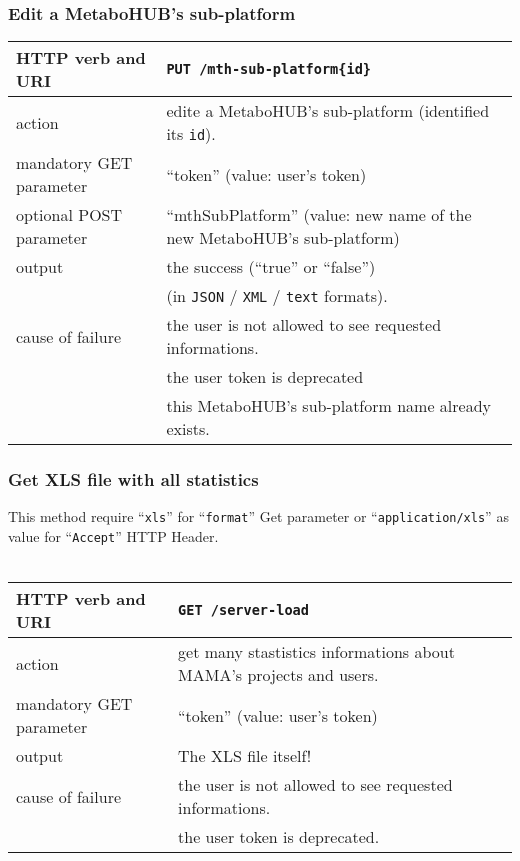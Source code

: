 \subsubsection{Edit a MetaboHUB's sub-platform}
\begin{tabular}{ | l | l | }
	\hline
	HTTP verb and URI & \texttt{PUT /mth-sub-platform\{id\}} \\
	\hline
	action & edite a MetaboHUB's sub-platform (identified \via its \texttt{id}). \\
	\hline
	mandatory GET parameter & ``token'' (value: user's token) \\
	\hline
	optional POST parameter & ``mthSubPlatform'' (value: new name of the new MetaboHUB's sub-platform) \\
	\hline
	output & the success (``true'' or ``false'')  \\
	\space & (in \texttt{JSON} / \texttt{XML} / \texttt{text} formats). \\
	\hline
	cause of failure & the user is not allowed to see requested informations. \\
	\space & the user token is deprecated \\
	\space & this MetaboHUB's sub-platform name already exists. \\
	\hline
\end{tabular}
\newline

\subsubsection{Get XLS file with all statistics}
\hspace*{\parindent}
This method require ``\texttt{xls}'' for ``\texttt{format}'' Get parameter or ``\texttt{application/xls}'' as value for ``\texttt{Accept}'' HTTP Header.
\\~\\
\begin{tabular}{ | l | l | }
	\hline
	HTTP verb and URI & \texttt{GET /server-load} \\
	\hline
	action & get many stastistics informations about MAMA's projects and users. \\
	\hline
	mandatory GET parameter & ``token'' (value: user's token) \\
	\hline
	output & The XLS file itself! \\
	\hline
	cause of failure & the user is not allowed to see requested informations. \\
	\space & the user token is deprecated. \\
	\hline
\end{tabular}
\newline

